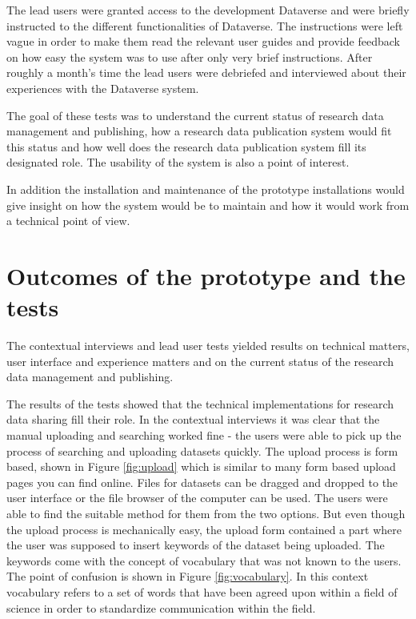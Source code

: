 The lead users were granted access to the development Dataverse and were
briefly instructed to the different functionalities of Dataverse. The
instructions were left vague in order to make them read the relevant user
guides and provide feedback on how easy the system was to use after only very
brief instructions. After roughly a month's time the lead users were debriefed
and interviewed about their experiences with the Dataverse system.

The goal of these tests was to understand the current status of research data
management and publishing, how a research data publication system would fit
this status and how well does the research data publication system fill its
designated role. The usability of the system is also a point of interest.

In addition the installation and maintenance of the prototype installations
would give insight on how the system would be to maintain and how it would work
from a technical point of view.

\section{Outcomes of the prototype and the tests}
\label{sec:prototype_outcomes}

The contextual interviews and lead user tests yielded results on technical matters,
user interface and experience matters and on the current status of the research
data management and publishing.

The results of the tests showed that the technical implementations for research
data sharing fill their role. In the contextual interviews it was clear that
the manual uploading and searching worked fine - the users were able to pick up
the process of searching and uploading datasets quickly. The upload process is form
based, shown in Figure \ref{fig:upload} which is similar to many
form based upload pages you can find online. Files for datasets can be dragged and
dropped to the user interface or the file browser of the computer can be used. The users
were able to find the suitable method for them from the two options. But even
though the upload process is mechanically easy, the upload form contained a part
where the user was supposed to insert keywords of the dataset being uploaded.
The keywords come with the concept of vocabulary that was not known to the
users. The point of confusion is shown in Figure \ref{fig:vocabulary}. In this context vocabulary
refers to a set of words that have been agreed upon within a field of science
in order to standardize communication within the field.

